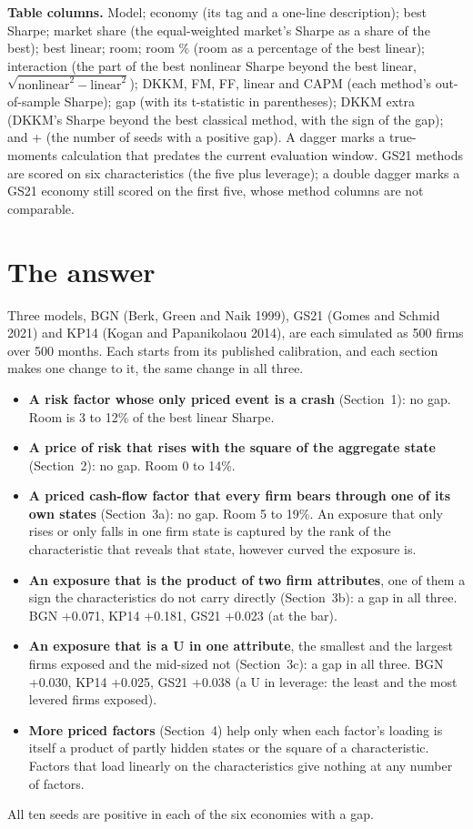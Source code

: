 \documentclass[11pt]{article}
\begin{document}
\textbf{Table columns.} Model; economy (its tag and a one-line description); best Sharpe; market share (the equal-weighted market's Sharpe as a share of the best); best linear; room; room \% (room as a percentage of the best linear); interaction (the part of the best nonlinear Sharpe beyond the best linear, $\sqrt{\text{nonlinear}^2 - \text{linear}^2}$); DKKM, FM, FF, linear and CAPM (each method's out-of-sample Sharpe); gap (with its t-statistic in parentheses); DKKM extra (DKKM's Sharpe beyond the best classical method, with the sign of the gap); and + (the number of seeds with a positive gap). A dagger marks a true-moments calculation that predates the current evaluation window. GS21 methods are scored on six characteristics (the five plus leverage); a double dagger marks a GS21 economy still scored on the first five, whose method columns are not comparable.

\section{The answer}

Three models, BGN (Berk, Green and Naik 1999), GS21 (Gomes and Schmid 2021) and KP14 (Kogan and Papanikolaou 2014), are each simulated as 500 firms over 500 months. Each starts from its published calibration, and each section makes one change to it, the same change in all three.

\begin{itemize}
\item \textbf{A risk factor whose only priced event is a crash} (Section~1): no gap. Room is 3 to 12\% of the best linear Sharpe.
\item \textbf{A price of risk that rises with the square of the aggregate state} (Section~2): no gap. Room 0 to 14\%.
\item \textbf{A priced cash-flow factor that every firm bears through one of its own states} (Section~3a): no gap. Room 5 to 19\%. An exposure that only rises or only falls in one firm state is captured by the rank of the characteristic that reveals that state, however curved the exposure is.
\item \textbf{An exposure that is the product of two firm attributes}, one of them a sign the characteristics do not carry directly (Section~3b): a gap in all three. BGN +0.071, KP14 +0.181, GS21 +0.023 (at the bar).
\item \textbf{An exposure that is a U in one attribute}, the smallest and the largest firms exposed and the mid-sized not (Section~3c): a gap in all three. BGN +0.030, KP14 +0.025, GS21 +0.038 (a U in leverage: the least and the most levered firms exposed).
\item \textbf{More priced factors} (Section~4) help only when each factor's loading is itself a product of partly hidden states or the square of a characteristic. Factors that load linearly on the characteristics give nothing at any number of factors.
\end{itemize}
All ten seeds are positive in each of the six economies with a gap.
\end{document}
